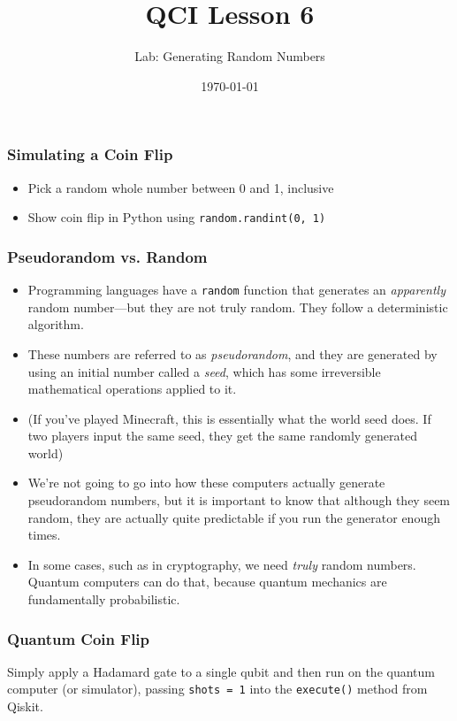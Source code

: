 \documentclass[12pt]{article}
\title[QCI Lesson 6]{QCI Lesson 6}
\subtitle{Lab: Generating Random Numbers}
\institute{Quantum Computing Initiative}
\date{\today}
\begin{document}
\begin{frame}
  \titlepage
\end{frame}

\begin{frame}
  \frametitle{Simulating a Coin Flip}

\begin{itemize}
  \item Pick a random whole number between 0 and 1, inclusive
  \item Show coin flip in Python using \texttt{random.randint(0, 1)}
\end{itemize}

\end{frame}

\begin{frame}
  \frametitle{Pseudorandom vs. Random}

\begin{itemize}
  \item Programming languages have a \texttt{random} function that generates an \textit{apparently}
    random number—but they are not truly random. They follow a deterministic
    algorithm.
  \item These numbers are referred to as \textit{pseudorandom}, and they are generated by using
    an initial number called a \textit{seed}, which has some irreversible mathematical
    operations applied to it.
  \item (If you've played Minecraft, this is essentially what the world seed does.
    If two players input the same seed, they get the same randomly generated world)
  \item We're not going to go into how these computers
    actually generate pseudorandom numbers, but it is important to know that
    although they seem random, they are actually quite predictable if you run
    the generator enough times.
  \item In some cases, such as in cryptography, we need \textit{truly} random numbers. Quantum
    computers can do that, because quantum mechanics are fundamentally probabilistic.
\end{itemize}

\end{frame}

\begin{frame}
    \frametitle{Quantum Coin Flip}
    Simply apply a Hadamard gate to a single qubit and then run on the quantum
    computer (or simulator), passing \texttt{shots = 1} into the
    \texttt{execute()} method from Qiskit.

\end{frame}
\end{document}
